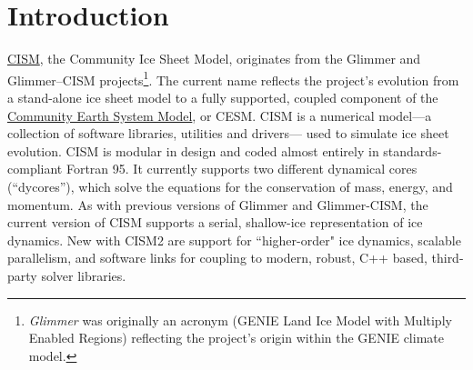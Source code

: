
\section{Introduction}
%
\href{http://oceans11.lanl.gov/cism/}{CISM}, 
the Community Ice Sheet Model, originates from the Glimmer and Glimmer--CISM 
projects\footnote{{\it Glimmer} was originally an acronym (GENIE Land Ice Model with Multiply Enabled Regions)
reflecting the project's origin within the GENIE climate model.}.
The current name reflects
the project's evolution from a stand-alone ice sheet model to a fully supported, 
coupled component of the \href{http://www2.cesm.ucar.edu/}{Community Earth System Model}, or CESM. 
CISM is a numerical model---a collection of software libraries, utilities and drivers---
 used to simulate ice sheet evolution. CISM is modular in design and coded almost 
entirely in standards-compliant Fortran 95. It currently supports two different 
dynamical cores (``dycores''), which solve the equations for the conservation of mass, energy, and momentum. 
As with previous versions of Glimmer and Glimmer-CISM, the current version of CISM 
supports a serial, shallow-ice representation of ice dynamics. 
New with CISM2 are support for ``higher-order" ice dynamics, scalable parallelism, 
and software links for coupling to modern, robust, C++ based, third-party solver libraries. 

%
